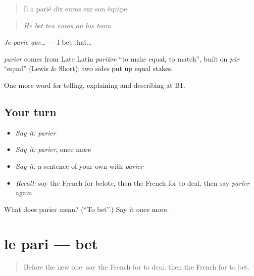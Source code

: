 \begin{quote}
Il a parié dix euros sur son équipe.
\end{quote}

\begin{quote}
\emph{He bet ten euros on his team.}
\end{quote}

\emph{Je parie que…} — I bet that…

\begin{cousinweb}
\emph{parier} comes from Late Latin \emph{pariāre} \textquotedblleft{}to make equal, to match\textquotedblright{}, built on \emph{pār} \textquotedblleft{}equal\textquotedblright{} (Lewis \& Short): two sides put up equal stakes.
\end{cousinweb}

\begin{grammarlens}[title={What you've built}]
One more word for telling, explaining and describing at B1.
\end{grammarlens}

\subsection*{Your turn}
\begin{itemize}
\raggedright
  \item \emph{Say it:} \emph{parier}
  \item \emph{Say it:} \emph{parier}, once more
  \item \emph{Say it:} a sentence of your own with \emph{parier}
  \item \emph{Recall:} say the French for belote, then the French for to deal, then say \emph{parier} again
\end{itemize}

\begin{tcolorbox}[breakable,colback=teal!4,colframe=teal!35!black,title={Before you move on}]
What does parier mean? (\textquotedblleft{}To bet\textquotedblright{}.) Say it once more.
\end{tcolorbox}
\section[le pari]{le pari — bet}

\label{lesson:FR-C500-pari}



\begin{quote}
Before the new one: say the French for to deal, then the French for to bet.
\end{quote}

